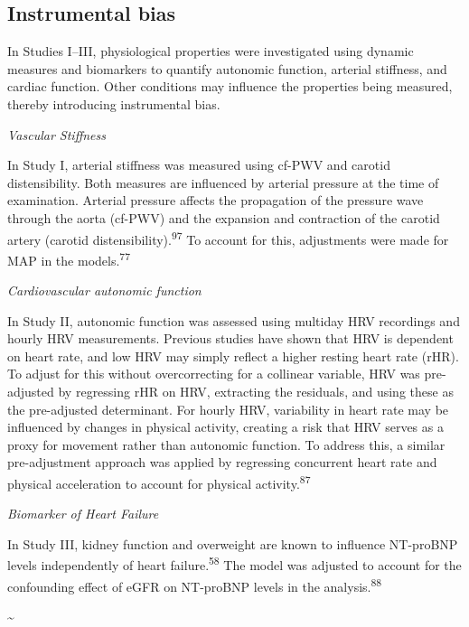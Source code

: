 \documentclass[
  a4paper,
  headsepline=true,
  open=any]{scrbook}
\begin{document}
\hypertarget{instrumental-bias}{%
\subsection{Instrumental bias}\label{instrumental-bias}}

In Studies I--III, physiological properties were investigated using
dynamic measures and biomarkers to quantify autonomic function, arterial
stiffness, and cardiac function. Other conditions may influence the
properties being measured, thereby introducing instrumental bias.

\emph{Vascular Stiffness}

In Study I, arterial stiffness was measured using cf-PWV and carotid
distensibility. Both measures are influenced by arterial pressure at the
time of examination. Arterial pressure affects the propagation of the
pressure wave through the aorta (cf-PWV) and the expansion and
contraction of the carotid artery (carotid
distensibility).\textsuperscript{97} To account for this, adjustments
were made for MAP in the models.\textsuperscript{77}

\emph{Cardiovascular autonomic function}

In Study II, autonomic function was assessed using multiday HRV
recordings and hourly HRV measurements. Previous studies have shown that
HRV is dependent on heart rate, and low HRV may simply reflect a higher
resting heart rate (rHR). To adjust for this without overcorrecting for
a collinear variable, HRV was pre-adjusted by regressing rHR on HRV,
extracting the residuals, and using these as the pre-adjusted
determinant. For hourly HRV, variability in heart rate may be influenced
by changes in physical activity, creating a risk that HRV serves as a
proxy for movement rather than autonomic function. To address this, a
similar pre-adjustment approach was applied by regressing concurrent
heart rate and physical acceleration to account for physical
activity.\textsuperscript{87}

\emph{Biomarker of Heart Failure}

In Study III, kidney function and overweight are known to influence
NT-proBNP levels independently of heart failure.\textsuperscript{58} The
model was adjusted to account for the confounding effect of eGFR on
NT-proBNP levels in the analysis.\textsuperscript{88}

\newpage

\thispagestyle{empty}

\textasciitilde{} \newpage
\end{document}
